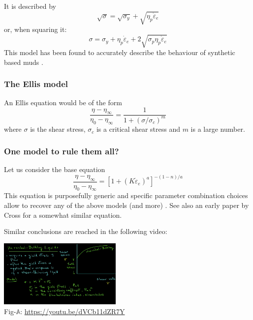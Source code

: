 It is described by \cite{barn99} 
\[
\sqrt{\sigma} = \sqrt{\sigma_y} + \sqrt{\eta_p \dot{\varepsilon}_e} 
\]
or, when squaring it:
\[
\sigma = \sigma_y + \eta_p \dot{\varepsilon}_e + 2\sqrt{\sigma_p \eta_p \dot{\varepsilon}_e} 
\]
This model has been found to accurately describe the behaviour of synthetic based muds \cite{adlo17}. 


\subsubsection{The Ellis model\label{ss:ellis}}

An Ellis equation would be of the form \cite{robc01} 
\[
\frac{\eta-\eta_\infty}{\eta_0-\eta_\infty} =
\frac{1}{1+(\sigma/\sigma_c)^m}
\]
where $\sigma$ is the shear stress, $\sigma_c$ is a critical shear stress
and $m$ is a large number. 



\subsubsection{One model to rule them all? \label{ss:cross}}

Let us consider the base equation
\[
\frac{\eta-\eta_\infty}{\eta_0-\eta_\infty} = 
\left[ 1+(K \dot{\varepsilon}_e)^a  \right]^{-(1-n)/a}
\]
This equation is purposefully generic and specific parameter combination choices 
allow to recover any of the above models (and more) \cite{osru14}.
See also an early paper by Cross \cite{cros65} for a somewhat similar equation. 

Similar conclusions are reached in the following video:
\begin{center}
\includegraphics[width=6cm]{images/rheology/hbyoutube}\\
{\captionfont Fig-$\mathds{A}$: \url{https://youtu.be/dVCb11dZR7Y}}
\end{center}



